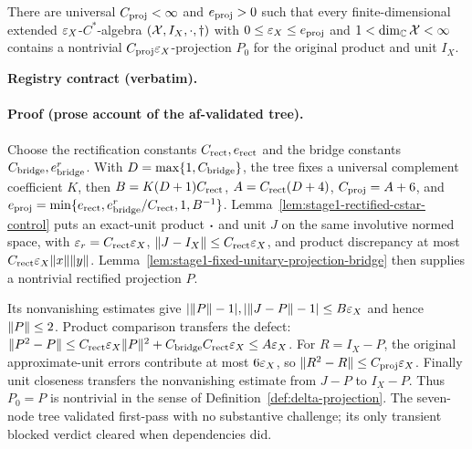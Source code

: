 \begin{lemma}\label{lem:stage1-rectified-nontrivial-projection}
There are universal $C_{\rm proj}<\infty$ and $e_{\rm proj}>0$ such that every
finite-dimensional extended $\varepsilon_X$-$C^*$-algebra $(\mathcal X,I_X,\cdot,\dagger)$ with
$0\le\varepsilon_X\le e_{\rm proj}$ and $1<\dim_{\mathbb C}\mathcal X<\infty$ contains a
nontrivial $C_{\rm proj}\varepsilon_X$-projection $P_0$ for the original product and unit $I_X$.
\end{lemma}

\noindent\textbf{Registry contract (verbatim).} 

\paragraph{Proof (prose account of the af-validated tree).}
Choose the rectification constants $C_{\rm rect},e_{\rm rect}$ and the bridge constants
$C_{\rm bridge},e_{\rm bridge}^r$.  With $D=\max\{1,C_{\rm bridge}\}$, the tree fixes a
universal complement coefficient $K$, then
$B=K(D+1)C_{\rm rect}$, $A=C_{\rm rect}(D+4)$,
$C_{\rm proj}=A+6$, and
$e_{\rm proj}=\min\{e_{\rm rect},e_{\rm bridge}^r/C_{\rm rect},1,B^{-1}\}$.
Lemma~\ref{lem:stage1-rectified-cstar-control} puts an exact-unit product $\mathbin{\bm{\cdot}}$ and unit
$J$ on the same involutive normed space, with $\varepsilon_r=C_{\rm rect}\varepsilon_X$,
$\lVert J-I_X\rVert\le C_{\rm rect}\varepsilon_X$, and product discrepancy at most
$C_{\rm rect}\varepsilon_X\lVert x\rVert\lVert y\rVert$.  Lemma~\ref{lem:stage1-fixed-unitary-projection-bridge}
then supplies a nontrivial rectified projection $P$.

Its nonvanishing estimates give $|\lVert P\rVert-1|,|\lVert J-P\rVert-1|\le B\varepsilon_X$ and hence
$\lVert P\rVert\le2$.  Product comparison transfers the defect:
$\lVert P^2-P\rVert\le C_{\rm rect}\varepsilon_X\lVert P\rVert^2+C_{\rm bridge}C_{\rm rect}\varepsilon_X
\le A\varepsilon_X$.  For $R=I_X-P$, the original approximate-unit errors contribute at most
$6\varepsilon_X$, so $\lVert R^2-R\rVert\le C_{\rm proj}\varepsilon_X$.  Finally unit closeness transfers the
nonvanishing estimate from $J-P$ to $I_X-P$.  Thus $P_0=P$ is nontrivial in the sense of
Definition~\ref{def:delta-projection}.  The seven-node tree validated first-pass with no
substantive challenge; its only transient blocked verdict cleared when dependencies did.

